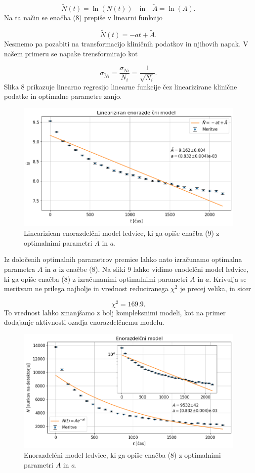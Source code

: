 \documentclass[slovene,11pt,a4paper]{article}
\begin{document}
\[
\tilde{N}(t) = \ln(N(t)) \quad \text{in} \quad \tilde{A} = \ln(A).
\]
Na ta način se enačba (8) prepiše v linearni funkcijo

\begin{equation}
\tilde{N}(t) = -at + \tilde{A}.
\end{equation}
Nesmemo pa pozabiti na transformacijo kliničnih podatkov in njihovih napak. V našem primeru se napake trensformirajo kot

\[
\sigma_{\tilde{N}i} = \frac{\sigma_{Ni}}{N_i} = \frac{1}{\sqrt{N_i}}.
\]
Slika 8 prikazuje linearno regresijo linearne funkcije čez linearizirane klinične podatke in optimalne parametre zanjo. 

\begin{figure}[h!]
\centering
\includegraphics[width=13cm]{ledvice2.png}
\caption{Lineariziean enorazdelčni model ledvice, ki ga opiše enačba (9) z optimalnimi parametri $\tilde{A}$ in $a$.}
\end{figure}
 Iz določenih optimalnih parametrov premice lahko nato izračunamo optimalna parametra $A$ in $a$ iz enačbe (8). Na sliki 9 lahko vidimo enodelčni model ledvice, ki ga opiše enačba (8) z izračunanimi optimalnimi parametri $A$ in $a$. Krivulja se meritvam ne prilega najbolje in vrednost reduciranega $\chi^2$ je precej velika, in sicer
 
\[
\chi^2 = 169.9.
\]
To vrednost lahko zmanjšamo z bolj kompleksnimi modeli, kot na primer dodajanje aktivnosti ozadja enorazdelčnemu modelu.

\begin{figure}[h!]
\centering
\includegraphics[width=13cm]{ledvice3.png}
\caption{Enorazdelčni model ledvice, ki ga opiše enačba (8) z optimalnimi parametri $A$ in $a$.}
\end{figure}
\end{document}
